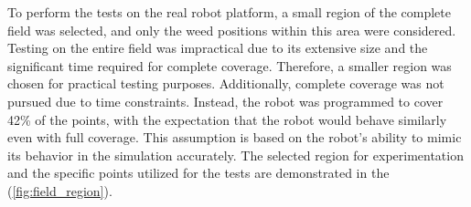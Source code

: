 To perform the tests on the real robot platform, a small region of the complete field was selected, and only the weed positions within this area were considered. Testing on the entire field was impractical due to its extensive size and the significant time required for complete coverage. Therefore, a smaller region was chosen for practical testing purposes. Additionally, complete coverage was not pursued due to time constraints. Instead, the robot was programmed to cover 42\% of the points, with the expectation that the robot would behave similarly even with full coverage. This assumption is based on the robot's ability to mimic its behavior in the simulation accurately. The selected region for experimentation and the specific points utilized for the tests are demonstrated in the (\autoref{fig:field_region}). 


